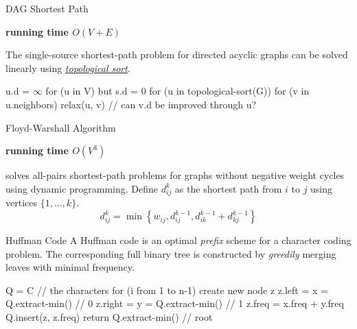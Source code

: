 \documentclass{cognito}
\begin{document}
\begin{note}{DAG Shortest Path}
	\begin{mdframed}[linecolor=black!25!white]
		\bf running time $O(V + E)$
	\end{mdframed}
	The single-source shortest-path problem for directed acyclic graphs can be solved linearly using \hyperref[note:Topological Sort]{\it topological sort}.
	\begin{largecode}
 u.d = $\infty$ for (u in V) but s.d = 0
 for (u in topological-sort(G))
	for (v in u.neighbors)
		relax(u, v)  // can v.d be improved through u?
	\end{largecode}
	\vspace{-5pt}
\end{note}

\begin{note}{Floyd-Warshall Algorithm}
	\begin{mdframed}[linecolor=black!25!white]
		\bf running time $O(V^3)$
	\end{mdframed}
	 solves all-pairs shortest-path problems for graphs without negative weight cycles using dynamic programming.
	Define $d_{ij}^{k}$ as the shortest path from $i$ to $j$ using vertices $\{1, ..., k\}$.
	$$
		d_{ij}^k = \min \left\{w_{ij}, d_{ij}^{k-1}, d_{ik}^{k-1} + d_{kj}^{k-1}\right\}
	$$
	\vspace{-10pt}
\end{note}


\begin{note}{Huffman Code}
	A Huffman code is an optimal \emph{prefix} scheme for a character coding problem.
	The corresponding full binary tree is constructed by \emph{greedily} merging leaves with minimal frequency.
	
	\begin{largecode}
 Q = C  // the characters
 for (i from 1 to n-1)
 	create new node z
	z.left = x = Q.extract-min()  // 0
	z.right = y = Q.extract-min() // 1
	z.freq = x.freq + y.freq
	Q.insert(z, z.freq)
 return Q.extract-min()  // root
	\end{largecode}
	\vspace{-5pt}
\end{note}
\end{document}
